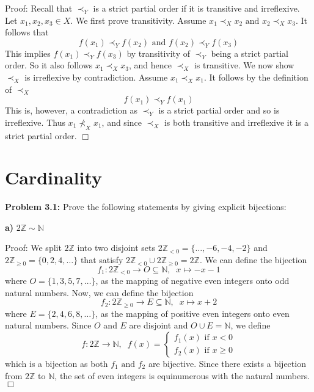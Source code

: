 \documentclass[11pt]{article}
\begin{document}
Proof: Recall that $\prec_Y$ is a strict partial order if it is transitive and irreflexive. Let $x_1, x_2, x_3 \in X$. We first prove transitivity. Assume $x_1 \prec_X x_2 \text{ and } x_2 \prec_X x_3$. It follows that 
\begin{equation*}
    f(x_1) \prec_Y f(x_2) \text{ and } f(x_2) \prec_Y f(x_3)   
\end{equation*}
This implies $f(x_1) \prec_Y f(x_3)$ by transitivity of $\prec_Y$ being a strict partial order. So it also follows $x_1 \prec_X x_3$, and hence $\prec_X$ is transitive. We now show $\prec_X$ is irreflexive by contradiction. Assume $x_1 \prec_X x_1$. It follows by the definition of $\prec_X$
\begin{equation*}
    f(x_1) \prec_Y f(x_1)
\end{equation*}
This is, however, a contradiction as $\prec_Y$ is a strict partial order and so is irreflexive. Thus $x_1 \nprec_X x_1$, and since $\prec_X$ is both transitive and irreflexive it is a strict partial order. $\Box$

\section{Cardinality}

\textbf{Problem 3.1:} Prove the following statements by giving explicit bijections:

\textbf{a)} $2 \mathbb{Z} \sim \mathbb{N}$

Proof: We split $2 \mathbb{Z}$ into two disjoint sets $2\mathbb{Z}_{< 0} = \{\dots, -6, -4, -2\}$ and $2\mathbb{Z}_{\geq 0} = \{0, 2, 4, \dots\}$ that satisfy $2 \mathbb{Z}_{< 0} \cup 2 \mathbb{Z}_{\geq 0} = 2 \mathbb{Z}$. We can define the bijection 
\begin{equation*}
    f_1 : 2\mathbb{Z}_{< 0} \rightarrow O \subseteq \mathbb{N}, \; \; x \mapsto -x - 1
\end{equation*}
where $O = \{1, 3, 5, 7, \dots\}$, as the mapping of negative even integers onto odd natural numbers. Now, we can define the bijection
\begin{equation*}
    f_2 : 2\mathbb{Z}_{\geq 0} \rightarrow E \subseteq \mathbb{N}, \; \; x \mapsto x + 2
\end{equation*}
where $E = \{2, 4, 6, 8, \dots\}$, as the mapping of positive even integers onto even natural numbers. Since $O$ and $E$ are disjoint and $O \cup E = \mathbb{N}$, we define 
\begin{equation*}
f : 2 \mathbb{Z} \rightarrow \mathbb{N}, \; \; f(x) = 
\begin{cases} 
f_1(x) \text{   if } x < 0 \\ 
f_2(x) \text{   if } x \geq 0 
\end{cases}
\end{equation*}
which is a bijection as both $f_1 \text{ and } f_2$ are bijective. Since there exists a bijection from $2 \mathbb{Z}$ to $\mathbb{N}$, the set of even integers is equinumerous with the natural numbers. $\Box$
\end{document}
